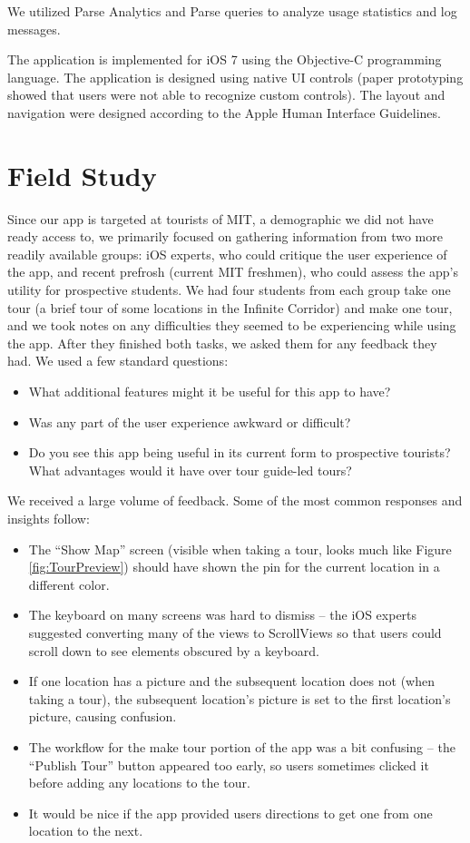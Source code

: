 \documentclass{sigchi}
\begin{document}
We utilized Parse Analytics and Parse queries to analyze usage statistics and log messages. 

The application is implemented for iOS 7 using the Objective-C programming language. The application is designed using native UI controls (paper prototyping showed that users were not able to recognize custom controls). The layout and navigation were designed according to the Apple Human Interface Guidelines.
    
\section{Field Study}
Since our app is targeted at tourists of MIT, a demographic we did not have ready access to, we primarily focused on gathering information from two more readily available groups: iOS experts, who could critique the user experience of the app, and recent prefrosh (current MIT freshmen), who could assess the app's utility for prospective students. We had four students from each group take one tour (a brief tour of some locations in the Infinite Corridor) and make one tour, and we took notes on any difficulties they seemed to be experiencing while using the app. After they finished both tasks, we asked them for any feedback they had. We used a few standard questions:
\begin{itemize}
\item What additional features might it be useful for this app to have?
\item Was any part of the user experience awkward or difficult?
\item Do you see this app being useful in its current form to prospective tourists? What advantages would it have over tour guide-led tours?
\end{itemize}
We received a large volume of feedback. Some of the most common responses and insights follow:
\begin{itemize}
\item The ``Show Map'' screen (visible when taking a tour, looks much like Figure~ \ref{fig:TourPreview}) should have shown the pin for the current location in a different color.
\item The keyboard on many screens was hard to dismiss -- the iOS experts suggested converting many of the views to ScrollViews so that users could scroll down to see elements obscured by a keyboard.
\item If one location has a picture and the subsequent location does not (when taking a tour), the subsequent location's picture is set to the first location's picture, causing confusion.
\item The workflow for the make tour portion of the app was a bit confusing -- the ``Publish Tour'' button appeared too early, so users sometimes clicked it before adding any locations to the tour.
\item It would be nice if the app provided users directions to get one from one location to the next.
\end{itemize}
\end{document}
